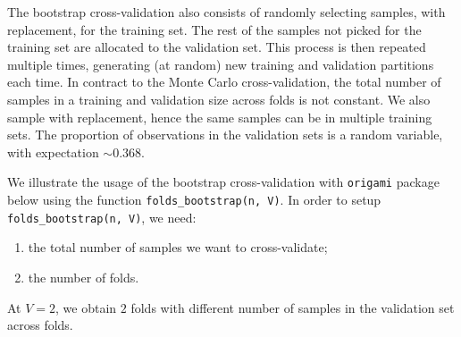 \documentclass[12pt, krantz2,]{krantz}
\providecommand{\tightlist}{%
  \setlength{\itemsep}{0pt}\setlength{\parskip}{0pt}}
\theoremstyle{definition}
\theoremstyle{definition}
\theoremstyle{definition}
\newcommand{\1}{\mathbbm{1}}
\begin{document}
The bootstrap cross-validation also consists of randomly selecting samples, with
replacement, for the training set. The rest of the samples not picked for the
training set are allocated to the validation set. This process is then repeated
multiple times, generating (at random) new training and validation partitions
each time. In contract to the Monte Carlo cross-validation, the total number of
samples in a training and validation size across folds is not constant. We also
sample with replacement, hence the same samples can be in multiple training
sets. The proportion of observations in the validation sets is a random
variable, with expectation \(\sim 0.368\).

We illustrate the usage of the bootstrap cross-validation with \texttt{origami} package
below using the function \texttt{folds\_bootstrap(n,\ V)}. In order to setup
\texttt{folds\_bootstrap(n,\ V)}, we need:

\begin{enumerate}
\def\labelenumi{\arabic{enumi}.}
\tightlist
\item
  the total number of samples we want to cross-validate;
\item
  the number of folds.
\end{enumerate}

At \(V=2\), we obtain \(2\) folds with different number of samples in the validation
set across folds.
\end{document}
